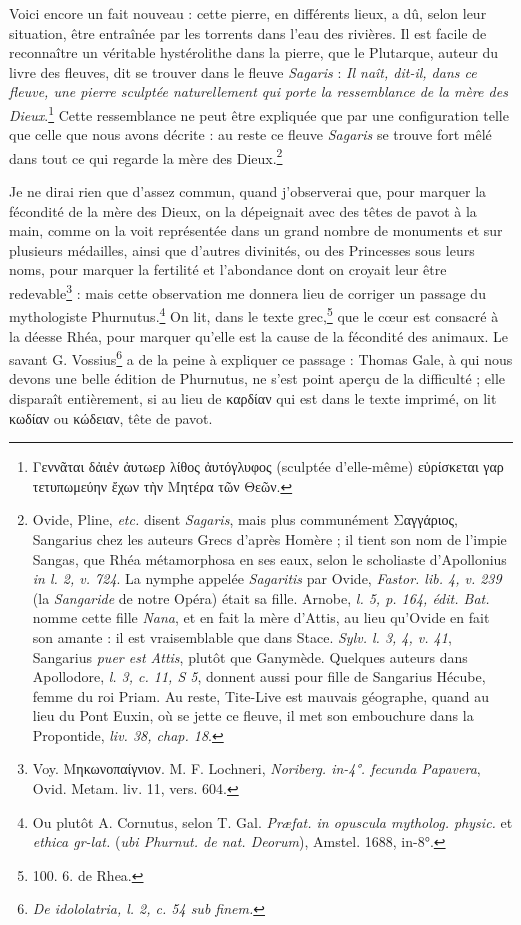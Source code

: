\documentclass[a4paper, 11pt, oneside, polutonikogreek, french]{article}
\begin{document}
Voici encore un fait nouveau : cette pierre, en différents lieux, a dû, selon leur situation, être entraînée par les torrents dans l'eau des rivières. Il est facile de reconnaître un véritable hystérolithe dans la pierre, que le Plutarque, auteur du livre des fleuves, dit se trouver dans le fleuve \emph{Sagaris} : \emph{Il naît, dit-il, dans ce fleuve, une pierre sculptée naturellement qui porte la ressemblance de la mère des Dieux}.\footnote{Γεννᾶται δἀιἐν ἀυτωερ λίθος ἀυτόγλυφος (sculptée d'elle-même) εὑρίσκεται γαρ τετυπωμεύην ἔχων τὴν Μητέρα τῶν Θεῶν.} Cette ressemblance ne peut être expliquée que par une configuration telle que celle que nous avons décrite : au reste ce fleuve \emph{Sagaris} se trouve fort mêlé dans tout ce qui regarde la mère des Dieux.\footnote{Ovide, Pline, \emph{etc.} disent \emph{Sagaris}, mais plus communément Σαγγάριος, Sangarius chez les auteurs Grecs d'après Homère ; il tient son nom de l'impie Sangas, que Rhéa métamorphosa en ses eaux, selon le scholiaste d'Apollonius \emph{in l. 2, v. 724}. La nymphe appelée \emph{Sagaritis} par Ovide, \emph{Fastor. lib. 4, v. 239} (la \emph{Sangaride} de notre Opéra) était sa fille. Arnobe, \emph{l. 5, p. 164, édit. Bat.} nomme cette fille \emph{Nana}, et en fait la mère d'Attis, au lieu qu'Ovide en fait son amante : il est vraisemblable que dans Stace. \emph{Sylv. l. 3, 4, v. 41}, Sangarius \emph{puer est Attis}, plutôt que Ganymède. Quelques auteurs dans Apollodore, \emph{l. 3, c. 11, S 5}, donnent aussi pour fille de Sangarius Hécube, femme du roi Priam. Au reste, Tite-Live est mauvais géographe, quand au lieu du Pont Euxin, où se jette ce fleuve, il met son embouchure dans la Propontide, \emph{liv. 38, chap. 18}.}

Je ne dirai rien que d'assez commun, quand j'observerai que, pour marquer la fécondité de la mère des Dieux, on la dépeignait avec des têtes de pavot à la main, comme on la voit représentée dans un grand nombre de monuments et sur plusieurs médailles, ainsi que d'autres divinités, ou des Princesses sous leurs noms, pour marquer la fertilité et l'abondance dont on croyait leur être redevable\footnote{Voy. Μηκωνοπαίγνιον. M. F. Lochneri, \emph{Noriberg. in-4°. fecunda Papavera}, Ovid. Metam. liv. 11, vers. 604.} : mais cette observation me donnera lieu de corriger un passage du mythologiste Phurnutus.\footnote{Ou plutôt A. Cornutus, selon T. Gal. \emph{Præfat. in opuscula mytholog. physic.} et \emph{ethica gr-lat.} (\emph{ubi Phurnut. de nat. Deorum}), Amstel. 1688, in-8°.} On lit, dans le texte grec,\footnote{100. 6. de Rhea.} que le cœur est consacré à la déesse Rhéa, pour marquer qu'elle est la cause de la fécondité des animaux. Le savant G. Vossius\footnote{\emph{De idololatria, l. 2, c. 54 sub finem.}} a de la peine à expliquer ce passage : Thomas Gale, à qui nous devons une belle édition de Phurnutus, ne s'est point aperçu de la difficulté ; elle disparaît entièrement, si au lieu de καρδίαν qui est dans le texte imprimé, on lit κωδίαν ou κώδειαν, tête de pavot.
\end{document}
